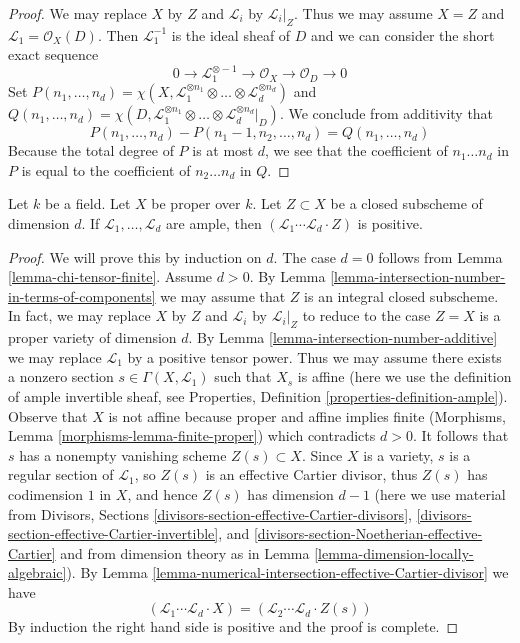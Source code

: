 \begin{proof}
We may replace $X$ by $Z$ and $\mathcal{L}_i$ by $\mathcal{L}_i|_Z$.
Thus we may assume $X = Z$ and $\mathcal{L}_1 = \mathcal{O}_X(D)$.
Then $\mathcal{L}_1^{-1}$ is the ideal sheaf of $D$ and we can
consider the short exact sequence
$$
0 \to \mathcal{L}_1^{\otimes -1} \to \mathcal{O}_X \to \mathcal{O}_D \to 0
$$
Set
$P(n_1, \ldots, n_d) =
\chi(X, \mathcal{L}_1^{\otimes n_1} \otimes \ldots \otimes
\mathcal{L}_d^{\otimes n_d})$
and
$Q(n_1, \ldots, n_d) =
\chi(D, \mathcal{L}_1^{\otimes n_1} \otimes \ldots \otimes
\mathcal{L}_d^{\otimes n_d}|_D)$.
We conclude from additivity that
$$
P(n_1, \ldots, n_d) - P(n_1 - 1, n_2, \ldots, n_d) =
Q(n_1, \ldots, n_d)
$$
Because the total degree of $P$ is at most $d$, we see that
the coefficient of $n_1 \ldots n_d$ in $P$ is equal to the coefficient
of $n_2 \ldots n_d$ in $Q$.
\end{proof}

\begin{lemma}
\label{lemma-ample-positive}
Let $k$ be a field. Let $X$ be proper over $k$. Let $Z \subset X$ be
a closed subscheme of dimension $d$. If $\mathcal{L}_1, \ldots, \mathcal{L}_d$
are ample, then $(\mathcal{L}_1 \cdots \mathcal{L}_d \cdot Z)$ is positive.
\end{lemma}

\begin{proof}
We will prove this by induction on $d$. The case $d = 0$
follows from Lemma \ref{lemma-chi-tensor-finite}. Assume $d > 0$.
By Lemma \ref{lemma-intersection-number-in-terms-of-components}
we may assume that $Z$ is an integral closed subscheme.
In fact, we may replace $X$ by $Z$ and $\mathcal{L}_i$
by $\mathcal{L}_i|_Z$ to reduce to the case $Z = X$ is a
proper variety of dimension $d$.
By Lemma \ref{lemma-intersection-number-additive}
we may replace $\mathcal{L}_1$ by a positive tensor power.
Thus we may assume there exists a nonzero section
$s \in \Gamma(X, \mathcal{L}_1)$
such that $X_s$ is affine (here we use the definition of
ample invertible sheaf, see
Properties, Definition \ref{properties-definition-ample}).
Observe that $X$ is not affine because proper and affine
implies finite (Morphisms, Lemma \ref{morphisms-lemma-finite-proper})
which contradicts $d > 0$. It follows that $s$ has a nonempty vanishing
scheme $Z(s) \subset X$. Since $X$ is a variety, $s$ is a regular section
of $\mathcal{L}_1$, so $Z(s)$ is an effective Cartier divisor,
thus $Z(s)$ has codimension $1$ in $X$, and
hence $Z(s)$ has dimension $d - 1$ (here we use material from
Divisors, Sections \ref{divisors-section-effective-Cartier-divisors},
\ref{divisors-section-effective-Cartier-invertible}, and
\ref{divisors-section-Noetherian-effective-Cartier}
and from dimension theory as in Lemma \ref{lemma-dimension-locally-algebraic}).
By Lemma \ref{lemma-numerical-intersection-effective-Cartier-divisor}
we have
$$
(\mathcal{L}_1 \cdots \mathcal{L}_d \cdot X) =
(\mathcal{L}_2 \cdots \mathcal{L}_d \cdot Z(s))
$$
By induction the right hand side is positive and the proof is complete.
\end{proof}

